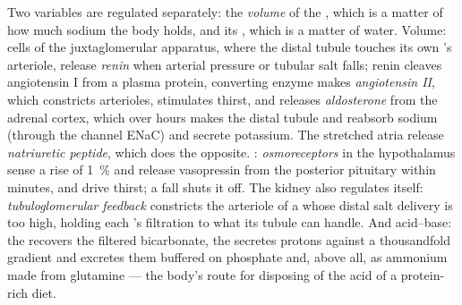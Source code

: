 \begin{definition}\label{def:b3:renal-osmoregulation:controls}
Two variables are regulated separately: the \emph{volume} of the
, which is a matter of how much sodium the body
holds, and its \emph{}, which is a matter of water. Volume:
cells of the juxtaglomerular apparatus, where the distal tubule
touches its own 's arteriole, release \emph{renin} when
arterial pressure or tubular salt falls; renin cleaves angiotensin I
from a plasma protein, converting enzyme makes \emph{angiotensin II},
which constricts arterioles, stimulates thirst, and releases
\emph{aldosterone} from the adrenal cortex, which over hours makes the
distal tubule and  reabsorb sodium (through the channel
ENaC) and secrete potassium. The stretched atria release
\emph{natriuretic peptide}, which does the opposite. :
\emph{osmoreceptors} in the hypothalamus sense a rise of \qty{1}{\%} and
release vasopressin from the posterior pituitary within minutes, and
drive thirst; a fall shuts it off. The kidney also regulates itself:
\emph{tubuloglomerular feedback} constricts the arteriole of a
 whose distal salt delivery is too high, holding each
's filtration to what its tubule can handle. And acid--base:
the  recovers the filtered bicarbonate, the  secretes protons against a thousandfold gradient and excretes
them buffered on phosphate and, above all, as ammonium made from
glutamine --- the body's route for disposing of the acid of a
protein-rich diet.
\end{definition}

